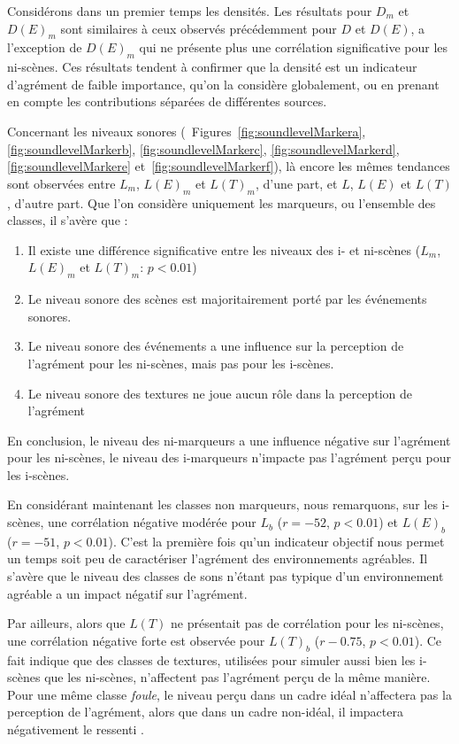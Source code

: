 Considérons dans un premier temps les densités. Les résultats pour $D_m$ et $D(E)_m$ sont similaires à ceux observés précédemment pour $D$ et $D(E)$, a l'exception de $D(E)_m$  qui ne présente plus une corrélation significative pour les ni-scènes. Ces résultats tendent à confirmer que la densité est un indicateur d'agrément de faible importance, qu'on la considère globalement, ou en prenant en compte les contributions séparées de différentes sources.


Concernant les niveaux sonores (\Cf~Figures~\ref{fig:soundlevelMarkera}, \ref{fig:soundlevelMarkerb}, \ref{fig:soundlevelMarkerc}, \ref{fig:soundlevelMarkerd}, \ref{fig:soundlevelMarkere} et~\ref{fig:soundlevelMarkerf}), là encore les mêmes tendances sont observées entre $L_m$, $L(E)_m$ et $L(T)_m$, d'une part, et $L$, $L(E)$ et $L(T)$, d'autre part. Que l'on considère uniquement les marqueurs, ou l'ensemble des classes, il s'avère que :

\begin{enumerate}
\item Il existe une différence significative entre les niveaux des i- et ni-scènes ($L_m$, $L(E)_m$ et $L(T)_m$: $p<0.01$) 
\item Le niveau sonore des scènes est majoritairement porté par les événements sonores.
\item Le niveau sonore des événements a une influence sur la perception de l'agrément pour les ni-scènes, mais pas pour les i-scènes.
\item Le niveau sonore des textures ne joue aucun rôle dans la perception de l'agrément
\end{enumerate}

En conclusion, le niveau des ni-marqueurs a une influence négative sur l'agrément pour les ni-scènes,   le niveau des i-marqueurs n’impacte pas l'agrément perçu pour les i-scènes.

En considérant maintenant les classes non marqueurs, nous remarquons, sur les i-scènes, une corrélation négative modérée pour $L_b$  ($r=-52$, $p<0.01$) et $L(E)_b$ ($r=-51$, $p<0.01$). C'est la première fois qu'un indicateur objectif nous permet un temps soit peu  de caractériser l'agrément des environnements agréables. Il s'avère que le niveau des classes de sons n'étant pas typique d'un environnement agréable a un impact négatif sur l'agrément. 

Par ailleurs, alors que $L(T)$ ne présentait pas de corrélation pour les ni-scènes, une corrélation négative forte est observée pour $L(T)_b$ ($r-0.75$, $p<0.01$). Ce fait indique que des classes de textures, utilisées pour simuler aussi bien les i-scènes que les ni-scènes, n'affectent pas l'agrément perçu de la même manière. Pour une même classe \emph{foule}, le niveau perçu dans un cadre idéal n'affectera pas la perception de l'agrément, alors que dans un cadre non-idéal, il impactera négativement le ressenti .

